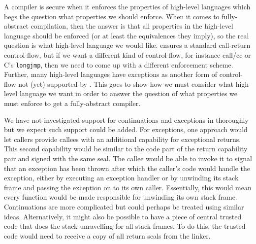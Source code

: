 \begin{jversion}
  A compiler is secure when it enforces the properties of high-level languages which begs the question what properties we should enforce.
  When it comes to fully-abstract compilation, then the answer is that all properties in the
  high-level language should be enforced (or at least the equivalences they imply), so the real question is what high-level language we would like.
  \stktokens{} ensures a standard call-return control-flow, but if we want a different kind of control-flow, for instance call/cc or C's \texttt{longjmp}, then we need to come up with a different enforcement scheme.
  Further, many high-level languages have exceptions as another form of control-flow not (yet) supported by \stktokens{}.
  This goes to show how we must consider what high-level language we want in order to answer the question of what properties we must enforce to get a fully-abstract compiler.

  We have not investigated support for continuations and exceptions in \stktokens{} thoroughly but we expect such support could be added.
  For exceptions, one approach would let callers provide callees with an additional capability for exceptional returns.
  This second capability would be similar to the code part of the return capability pair and signed with the same seal.
  The callee would be able to invoke it to signal that an exception has been thrown after which the caller's code would handle the exception, either by executing an exception handler or by unwinding its stack frame and passing the exception on to its own caller.
  Essentially, this would mean every function would be made responsible for unwinding its own stack frame.
  Continuations are more complicated but could perhaps be treated using similar ideas.
  Alternatively, it might also be possible to have a piece of central trusted code that does the stack unravelling for all stack frames.
  To do this, the trusted code would need to receive a copy of all return seals from the linker.


\end{jversion}
